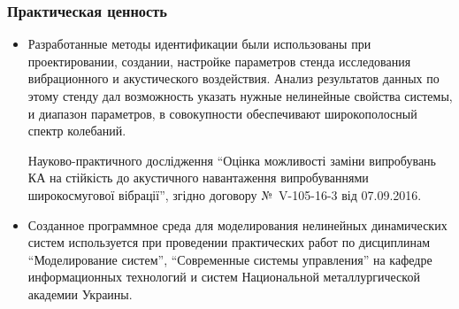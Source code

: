 \documentclass[14pt,handout,utf8]{beamer}
\begin{document}

\begin{frame}
  \frametitle{Практическая ценность}

  \begin{itemize}

    \item
      Разработанные методы идентификации были использованы при проектировании,
      создании, настройке параметров стенда исследования вибрационного и
      акустического воздействия. Анализ результатов данных по этому стенду дал
      возможность указать нужные нелинейные свойства системы, и диапазон параметров,
      в совокупности обеспечивают широкополосный спектр колебаний.

      Науково-практичного дослідження
      ``Оцінка    можливості заміни випробувань КА на стійкість до акустичного навантаження
      випробуваннями широкосмугової вібрації'', згідно договору №~V-105-16-3 від 07.09.2016.

    \item
      Созданное программное среда для моделирования нелинейных динамических систем
      используется при проведении практических работ по дисциплинам
      ``Моделирование систем'', ``Современные системы управления''
      на кафедре информационных технологий
      и систем Национальной металлургической академии Украины.

  \end{itemize}


\end{frame}



\end{document}
